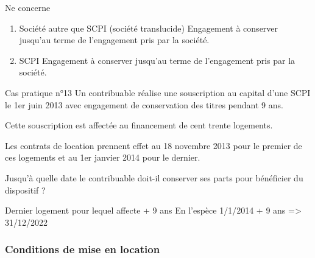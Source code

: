 			Ne concerne

			\begin{enumerate}
				\item Société autre que SCPI (société translucide) Engagement à conserver jusqu'au terme de l'engagement pris par la société.
				\item SCPI Engagement à conserver jusqu'au terme de l'engagement pris par la société.
			\end{enumerate}

			\begin{casPratique}{Cas pratique n°13}
				Un contribuable réalise une souscription au capital d'une SCPI le 1er juin 2013 avec engagement de conservation des titres pendant 9 ans.

				Cette souscription est affectée au financement de cent trente logements.

				Les contrats de location prennent effet au 18 novembre 2013 pour le premier de ces logements et au 1er janvier 2014 pour le dernier.

				Jusqu’à quelle date le contribuable doit-il conserver ses parts pour bénéficier du dispositif ?
			\end{casPratique}

			Dernier logement pour lequel affecte + 9 ans
			En l'espèce 1/1/2014 + 9 ans => 31/12/2022


			\subsubsection{Conditions de mise en location}

